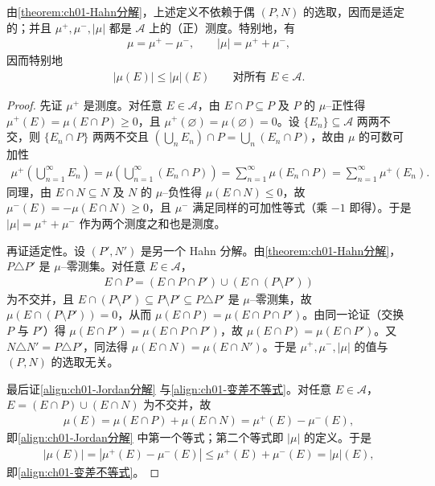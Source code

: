 \documentclass[../../main.tex]{subfiles}%
\begin{document}
由\cref{theorem:ch01-Hahn分解}，上述定义不依赖于偶 $(P,N)$ 的选取，因而是适定的；并且 $\mu^+,\mu^-,|\mu|$ 都是 $\mathcal{A}$ 上的（正）测度。特别地，有
\begin{align}
\mu=\mu^+-\mu^-,\qquad |\mu|=\mu^++\mu^-, \label{align:ch01-Jordan分解}
\end{align}
因而特别地
\begin{align}
|\mu(E)|\leqslant|\mu|(E)\qquad\text{对所有 }E\in\mathcal{A}. \label{align:ch01-变差不等式}
\end{align}

\begin{proof}
先证 $\mu^+$ 是测度。对任意 $E\in\mathcal{A}$，由 $E\cap P\subseteq P$ 及 $P$ 的 $\mu$--正性得 $\mu^+(E)=\mu(E\cap P)\geqslant0$，且 $\mu^+(\varnothing)=\mu(\varnothing)=0$。设 $\{E_n\}\subseteq\mathcal{A}$ 两两不交，则 $\{E_n\cap P\}$ 两两不交且 $\left(\bigcup_n E_n\right)\cap P=\bigcup_n(E_n\cap P)$，故由 $\mu$ 的可数可加性
\begin{align*}
\mu^+\left(\bigcup_{n=1}^\infty E_n\right)=\mu\left(\bigcup_{n=1}^\infty(E_n\cap P)\right)=\sum_{n=1}^\infty\mu(E_n\cap P)=\sum_{n=1}^\infty\mu^+(E_n).
\end{align*}
同理，由 $E\cap N\subseteq N$ 及 $N$ 的 $\mu$--负性得 $\mu(E\cap N)\leqslant0$，故 $\mu^-(E)=-\mu(E\cap N)\geqslant0$，且 $\mu^-$ 满足同样的可加性等式（乘 $-1$ 即得）。于是 $|\mu|=\mu^++\mu^-$ 作为两个测度之和也是测度。

再证适定性。设 $(P',N')$ 是另一个 Hahn 分解。由\cref{theorem:ch01-Hahn分解}，$P\triangle P'$ 是 $\mu$--零测集。对任意 $E\in\mathcal{A}$，
\begin{align*}
E\cap P=(E\cap P\cap P')\cup(E\cap(P\setminus P'))
\end{align*}
为不交并，且 $E\cap(P\setminus P')\subseteq P\setminus P'\subseteq P\triangle P'$ 是 $\mu$--零测集，故 $\mu(E\cap(P\setminus P'))=0$，从而 $\mu(E\cap P)=\mu(E\cap P\cap P')$。由同一论证（交换 $P$ 与 $P'$）得 $\mu(E\cap P')=\mu(E\cap P\cap P')$，故 $\mu(E\cap P)=\mu(E\cap P')$。又 $N\triangle N'=P\triangle P'$，同法得 $\mu(E\cap N)=\mu(E\cap N')$。于是 $\mu^+,\mu^-,|\mu|$ 的值与 $(P,N)$ 的选取无关。

最后证\eqref{align:ch01-Jordan分解} 与\eqref{align:ch01-变差不等式}。对任意 $E\in\mathcal{A}$，$E=(E\cap P)\cup(E\cap N)$ 为不交并，故
\begin{align*}
\mu(E)=\mu(E\cap P)+\mu(E\cap N)=\mu^+(E)-\mu^-(E),
\end{align*}
即\eqref{align:ch01-Jordan分解} 中第一个等式；第二个等式即 $|\mu|$ 的定义。于是
\begin{align*}
|\mu(E)|=|\mu^+(E)-\mu^-(E)|\leqslant\mu^+(E)+\mu^-(E)=|\mu|(E),
\end{align*}
即\eqref{align:ch01-变差不等式}。
\end{proof}
\end{document}
